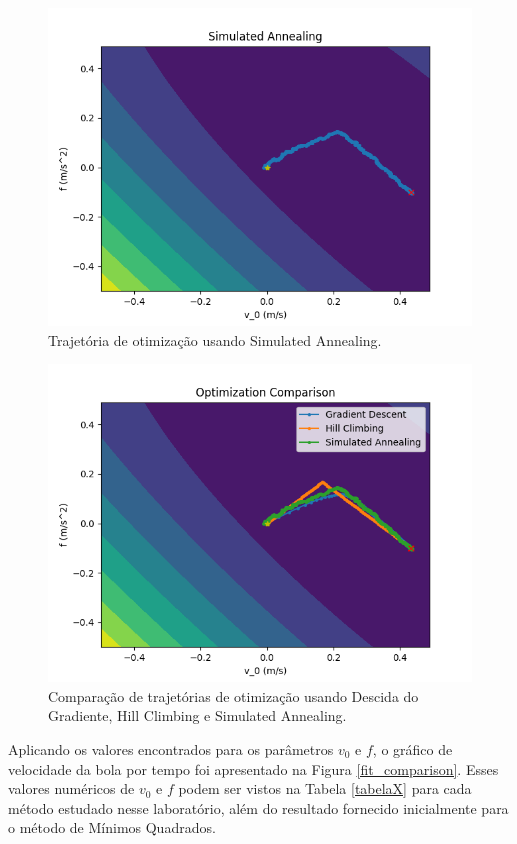 \documentclass[conference]{IEEEtran}
\begin{document}
\begin{figure}[htbp]
\centering
\centerline{\includegraphics[scale=0.4]{simulated_annealing.png}}
\caption{Trajetória de otimização usando Simulated Annealing.}
\label{simulated_annealing}
\end{figure}

\begin{figure}[htbp]
\centering
\centerline{\includegraphics[scale=0.4]{optimization_comparison.png}}
\caption{Comparação de trajetórias de otimização usando Descida do Gradiente, Hill Climbing e Simulated Annealing.}
\label{optimization_comparison}
\end{figure}

Aplicando os valores encontrados para os parâmetros $v_0$ e $f$, o gráfico de velocidade da bola por tempo foi apresentado na Figura \ref{fit_comparison}. Esses valores numéricos de $v_0$ e $f$ podem ser vistos na Tabela \ref{tabelaX} para cada método estudado nesse laboratório, além do resultado fornecido inicialmente para o método de Mínimos Quadrados.
\end{document}
